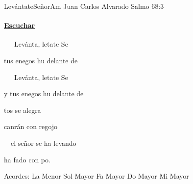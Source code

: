 \documentclass[12pt, spanish]{book}
\begin{document}
    \begin{song}{Lev\'antateSe\~nor}{Am}
        {} %
        {Juan Carlos Alvarado}
        {Salmo 68:3} %
        {}
        \ifChordBk
        \paragraph{\mbox{}\hfill\protect\href{https://open.spotify.com/intl-es/track/2l3owijbCx3FpYYoxunKmD}{Escuchar}\mbox{}\hfill}
        \fi


        \begin{SBChorus}
            ~~~Levánta, letate Se~~~

             tus enegos hu delante de ~~~


            ~~~Levánta, letate Se~~~

            y  tus enegos hu delante de ~~~
        \end{SBChorus}

        \begin{SBOpGroup}
              tos se alegra

            canrán con regojo

            ~~el señor se ha levando

            ha fado con po.
        \end{SBOpGroup}

        \ifChordBk
        \begin{SBOpGroup}
            Acordes:
            \upchord{\Am}\qquad La Menor \hfill
            \upchord{\G}\qquad Sol Mayor \hfill\null\break
            \upchord{\F}\qquad Fa Mayor \hfill
            \upchord{\C}\qquad Do Mayor \hfill
            \upchord{\E}\qquad Mi Mayor \hfill\null\break
        \end{SBOpGroup}
        \fi
    \end{song}
\end{document}
